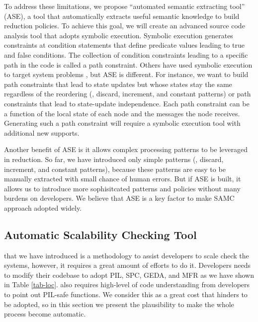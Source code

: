 To address these limitations, we propose ``automated semantic extracting tool''
(ASE), a tool that automatically extracts useful semantic knowledge to build
reduction policies. To achieve this goal, we will create an advanced source code
analysis tool that adopts symbolic execution. Symbolic execution generates
constraints at condition statements that define predicate values leading to true
and false conditions. The collection of condition constraints leading to a
specific path in the code is called a path constraint. Others have used symbolic
execution to target system problems \cite{Bucur+14-SymbolicExecution}, but ASE
is different. For instance, we want to build path constraints that lead to state
updates but whose states stay the same regardless of the reordering (\eg,
discard, increment, and constant patterns) or path constraints that lead to
state-update independence. Each path constraint can be a function of the local
state of each node and the messages the node receives. Generating such a path
constraint will require a symbolic execution tool with additional new supports.

Another benefit of ASE is it allows complex processing patterns to be leveraged
in reduction. So far, we have introduced only simple patterns (\eg, discard,
increment, and constant patterns), because these patterns are easy to be
manually extracted with small chance of human errors. But if ASE is built, it
allows us to introduce more sophisitcated patterns and policies without many
burdens on developers. We believe that ASE is a key factor to make SAMC approach
adopted widely.

\subsection{Automatic Scalability Checking Tool}

\sck that we have introduced is a methodology to assist developers to scale
check the systems, however, it requires a great amount of efforts to do it. 
Developers needs to modify their codebase to adopt PIL, SPC, GEDA, and MFR as we
have shown in Table \ref{tab-loc}. \sck also requires high-level of code
understanding from developers to point out PIL-safe functions. We consider this
as a great cost that hinders \sck to be adopted, so in this section we present
the plausibility to make the whole process become automatic.



